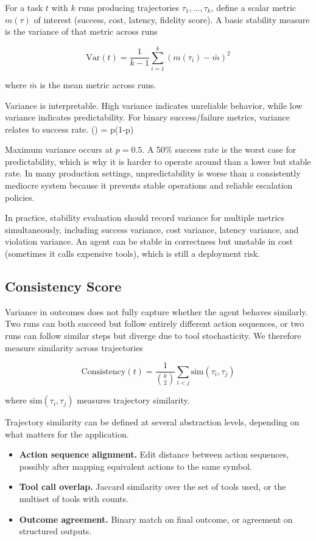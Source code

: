 For a task $t$ with $k$ runs producing trajectories $\tau_1, \ldots, \tau_k$, define a scalar metric $m(\tau)$ of interest (success, cost, latency, fidelity score). A basic stability measure is the variance of that metric across runs

\[
  \text{Var}(t) = \frac{1}{k-1} \sum_{i=1}^{k} (m(\tau_i) - \bar{m})^2
\]

where $\bar{m}$ is the mean metric across runs.

Variance is interpretable. High variance indicates unreliable behavior, while low variance indicates predictability. For binary success/failure metrics, variance relates to success rate. () = p(1-p)

Maximum variance occurs at $p = 0.5$. A 50\% success rate is the worst case for predictability, which is why it is harder to operate around than a lower but stable rate. In many production settings, unpredictability is worse than a consistently mediocre system because it prevents stable operations and reliable escalation policies.

In practice, stability evaluation should record variance for multiple metrics simultaneously, including success variance, cost variance, latency variance, and violation variance. An agent can be stable in correctness but unstable in cost (sometimes it calls expensive tools), which is still a deployment risk.

\subsection{Consistency Score}

Variance in outcomes does not fully capture whether the agent behaves similarly. Two runs can both succeed but follow entirely different action sequences, or two runs can follow similar steps but diverge due to tool stochasticity. We therefore measure similarity across trajectories

\[
\text{Consistency}(t) = \frac{1}{\binom{k}{2}} \sum_{i < j} \text{sim}(\tau_i, \tau_j)
\]

where $\text{sim}(\tau_i, \tau_j)$ measures trajectory similarity.

Trajectory similarity can be defined at several abstraction levels, depending on what matters for the application.

\begin{itemize}
\item \textbf{Action sequence alignment.} Edit distance between action sequences, possibly after mapping equivalent actions to the same symbol.
\item \textbf{Tool call overlap.} Jaccard similarity over the set of tools used, or the multiset of tools with counts.
\item \textbf{Outcome agreement.} Binary match on final outcome, or agreement on structured outputs.
\end{itemize}

